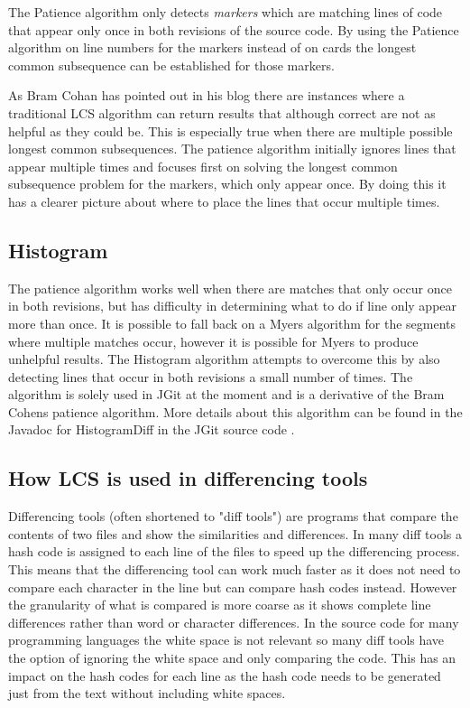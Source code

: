 The Patience algorithm only detects \emph{markers} which are matching lines of code that appear only once in both revisions of the source code.
By using the Patience algorithm on line numbers for the markers instead of on cards the longest common subsequence can be established for those markers. 

As Bram Cohan \cite{bramcohen} has pointed out in his blog there are instances where a traditional LCS algorithm can return results that although correct are not as helpful as they could be.
This is especially true when there are multiple possible longest common subsequences.
The patience algorithm initially ignores lines that appear multiple times and focuses first on solving the longest common subsequence problem for the markers, which only appear once. 
By doing this it has a clearer picture about where to place the lines that occur multiple times.

\subsection{Histogram}
The patience algorithm works well when there are matches that only occur once in both revisions, but has difficulty in determining what to do if line only appear more than once.
It is possible to fall back on a Myers algorithm for the segments where multiple matches occur, however it is possible for Myers to produce unhelpful results. 
The Histogram algorithm attempts to overcome this by also detecting lines that occur in both revisions a small number of times.
The algorithm is solely used in JGit at the moment and is a derivative of the Bram Cohens patience algorithm. 
More details about this algorithm can be found in the Javadoc for HistogramDiff in the JGit source code \cite{Foundation2014}. 



\subsection{How LCS is used in differencing tools}
Differencing tools (often shortened to "diff tools") are programs that compare the contents of two files and show the similarities and differences.
In many diff tools a hash code is assigned to each line of the files to speed up the differencing process.
This means that the differencing tool can work much faster as it does not need to compare each character in the line but can compare hash codes instead.
However the granularity of what is compared is more coarse as it shows complete line differences rather than word or character differences. 
In the source code for many programming languages the white space is not relevant so many diff tools have the option of ignoring the white space and only comparing the code.
This has an impact on the hash codes for each line as the hash code needs to be generated just from the text without including white spaces.

